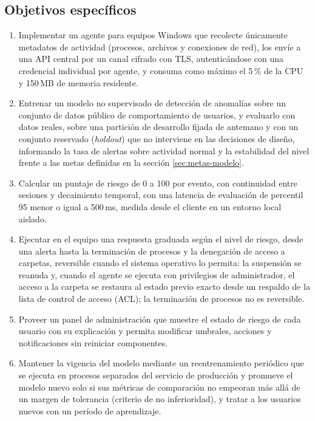 \subsection{Objetivos específicos}
\begin{enumerate}
  \item Implementar un agente para equipos Windows que recolecte únicamente metadatos de actividad
        (procesos, archivos y conexiones de red), los envíe a una API central por un canal cifrado
        con TLS, autenticándose con una credencial individual por agente, y consuma como máximo el 5\,\% de la CPU y
        150\,MB de memoria residente.
  \item Entrenar un modelo no supervisado de detección de anomalías
        sobre un conjunto de datos público de comportamiento de usuarios, y evaluarlo con datos reales,
        sobre una partición de desarrollo fijada de antemano y con un conjunto reservado
        (\emph{holdout}) que no interviene en las decisiones de diseño, informando la tasa de alertas sobre actividad normal y la estabilidad del nivel frente a las metas
        definidas en la sección \ref{sec:metas-modelo}.
  \item Calcular un puntaje de riesgo de 0 a 100 por evento, con continuidad entre sesiones y
        decaimiento temporal, con una latencia de evaluación de percentil 95 menor o igual a 500\,ms,
        medida desde el cliente en un entorno local aislado.
  \item Ejecutar en el equipo una respuesta graduada según el nivel de riesgo, desde una alerta hasta
        la terminación de procesos y la denegación de acceso a carpetas, reversible cuando el sistema
        operativo lo permita: la suspensión se reanuda y, cuando el agente se ejecuta con privilegios
        de administrador, el acceso a la carpeta se restaura al estado previo exacto desde un
        respaldo de la lista de control de acceso (ACL); la terminación de procesos no es reversible.
  \item Proveer un panel de administración que muestre el estado de riesgo de cada usuario con su
        explicación y permita modificar umbrales, acciones y notificaciones sin reiniciar componentes.
  \item Mantener la vigencia del modelo mediante un reentrenamiento periódico que se ejecuta en
        procesos separados del servicio de producción y promueve el modelo nuevo solo si sus métricas
        de comparación no empeoran más allá de un margen de tolerancia (criterio de no
        inferioridad), y tratar a los usuarios nuevos con un período de aprendizaje.

\end{enumerate}
